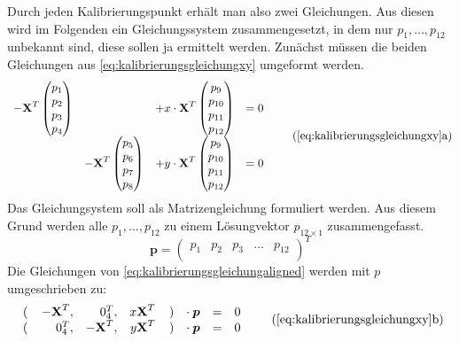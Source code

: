 Durch jeden Kalibrierungspunkt erhält man also zwei Gleichungen. Aus diesen wird im Folgenden ein Gleichungssystem zusammengesetzt, in dem nur $p_1, \dots, p_{12}$ unbekannt sind, diese sollen ja ermittelt werden. Zunächst müssen die beiden Gleichungen aus \eqref{eq:kalibrierungsgleichungxy} umgeformt werden.
\begin{equation*}\label{eq:kalibrierungsgleichungaligned}
	\begin{array}{cccc}
		-\XH^T\begin{pmatrix}p_1\\p_2\\p_3\\p_4\\\end{pmatrix} & & +x\cdot\XH^T\begin{pmatrix}p_9\\p_{10}\\p_{11}\\p_{12}\\\end{pmatrix} & =0\\
		& -\XH^T\begin{pmatrix}p_5\\p_6\\p_7\\p_8\\\end{pmatrix} & +y\cdot\XH^T\begin{pmatrix}p_9\\p_{10}\\p_{11}\\p_{12}\\\end{pmatrix} & =0
	\end{array} \tag{\ref{eq:kalibrierungsgleichungxy}a}
\end{equation*}
Das Gleichungsystem soll als Matrizengleichung formuliert werden. Aus diesem Grund werden alle $p_1, \dots, p_{12}$ zu einem Lösungvektor $p_{12{\times}1}$ zusammengefasst.
\begin{equation}
	\boldsymbol{p} = \begin{pmatrix}p_1&p_2&p_3&\dots&p_{12}\\\end{pmatrix}^T
\end{equation}
Die Gleichungen von \eqref{eq:kalibrierungsgleichungaligned} werden mit $p$ umgeschrieben zu:
\begin{equation}
	\begin{array}{r rrr l lll}
		\left(\right. & -\XH^T, & 0_4^T,  & x\XH^T & \left.\right) & \cdot\: \boldsymbol{p} & = & 0\\
		\left(\right. & 0_4^T,  & -\XH^T, & y\XH^T & \left.\right) & \cdot\: \boldsymbol{p} & = & 0
	\end{array} \tag{\ref{eq:kalibrierungsgleichungxy}b}
\end{equation}
